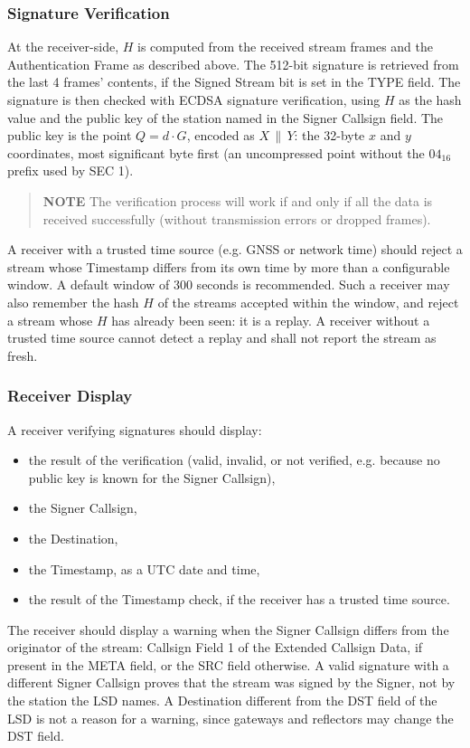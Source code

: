 \documentclass[a4paper,11pt,oneside]{book}
\begin{document}
\subsubsection{Signature Verification}
At the receiver-side, $H$ is computed from the received stream frames and the Authentication Frame as described above. The 512-bit signature is retrieved from the last 4 frames' contents, if the Signed Stream bit is set in the TYPE field. The signature is then checked with ECDSA signature verification, using $H$ as the hash value and the public key of the station named in the Signer Callsign field. The public key is the point $Q = d \cdot G$, encoded as $X \,\|\, Y$: the 32-byte $x$ and $y$ coordinates, most significant byte first (an uncompressed point without the $04_{16}$ prefix used by SEC 1).
\begin{quote}
	\textbf{NOTE} The verification process will work if and only if all the data is received successfully (without transmission errors or dropped frames).
\end{quote}

A receiver with a trusted time source (e.g. GNSS or network time) should reject a stream whose Timestamp differs from its own time by more than a configurable window. A default window of 300 seconds is recommended. Such a receiver may also remember the hash $H$ of the streams accepted within the window, and reject a stream whose $H$ has already been seen: it is a replay. A receiver without a trusted time source cannot detect a replay and shall not report the stream as fresh.

\subsubsection{Receiver Display}
A receiver verifying signatures should display:
\begin{itemize}
	\item the result of the verification (valid, invalid, or not verified, e.g. because no public key is known for the Signer Callsign),
	\item the Signer Callsign,
	\item the Destination,
	\item the Timestamp, as a UTC date and time,
	\item the result of the Timestamp check, if the receiver has a trusted time source.
\end{itemize}

The receiver should display a warning when the Signer Callsign differs from the originator of the stream: Callsign Field 1 of the Extended Callsign Data, if present in the META field, or the SRC field otherwise. A valid signature with a different Signer Callsign proves that the stream was signed by the Signer, not by the station the LSD names. A Destination different from the DST field of the LSD is not a reason for a warning, since gateways and reflectors may change the DST field.
\end{document}
